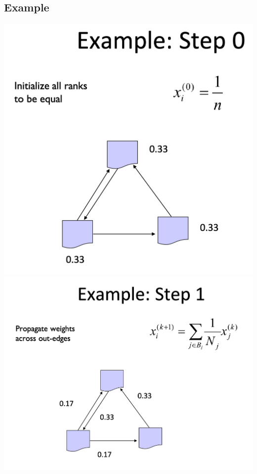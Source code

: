 \documentclass[11pt]{article}
\theoremstyle{definition}
\begin{document}
\subsection{Example}
\includegraphics[width=\textwidth/3]{29.png}
\includegraphics[width=\textwidth/2]{30.png}
\end{document}
